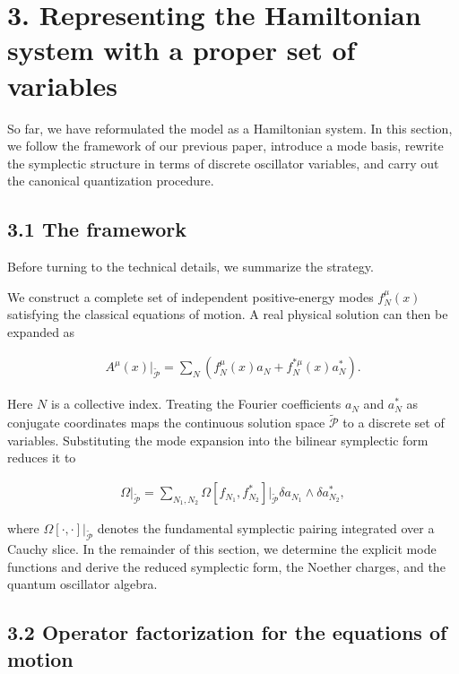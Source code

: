 \section{3. Representing the Hamiltonian system with a proper set of variables}\label{sec:quantization}

So far, we have reformulated the model as a Hamiltonian system. In this section, we follow the framework of our previous paper, introduce a mode basis, rewrite the symplectic structure in terms of discrete oscillator variables, and carry out the canonical quantization procedure.

\subsection{3.1 The framework}\label{subsec:quantization-framework}

Before turning to the technical details, we summarize the strategy.

We construct a complete set of independent positive-energy modes $f_N^\mu(x)$ satisfying the classical equations of motion. A real physical solution can then be expanded as

\begin{align}
A^\mu(x)\big|_{\widetilde{\mathcal{P}}} = \sum_N (f_N^\mu(x) a_N +f_{N}^{*\mu}(x)a_{N}^{*}).
\end{align}

Here $N$ is a collective index. Treating the Fourier coefficients $a_N$ and $a_N^*$ as conjugate coordinates maps the continuous solution space $\widetilde{\mathcal{P}}$ to a discrete set of variables. Substituting the mode expansion into the bilinear symplectic form reduces it to

\begin{align}
\Omega\big|_{\widetilde{\mathcal{P}}} =\sum_{N_1, N_2} \Omega[f_{N_1}, f^{*}_{N_2}]\big|_{\widetilde{\mathcal{P}}} \delta a_{N_1} \wedge \delta a^{*}_{N_2},
\end{align}

where $\Omega[\cdot,\cdot]|_{\widetilde{\mathcal{P}}}$ denotes the fundamental symplectic pairing integrated over a Cauchy slice. In the remainder of this section, we determine the explicit mode functions and derive the reduced symplectic form, the Noether charges, and the quantum oscillator algebra.

\subsection{3.2 Operator factorization for the equations of motion}\label{subsec:operator-factorization}

